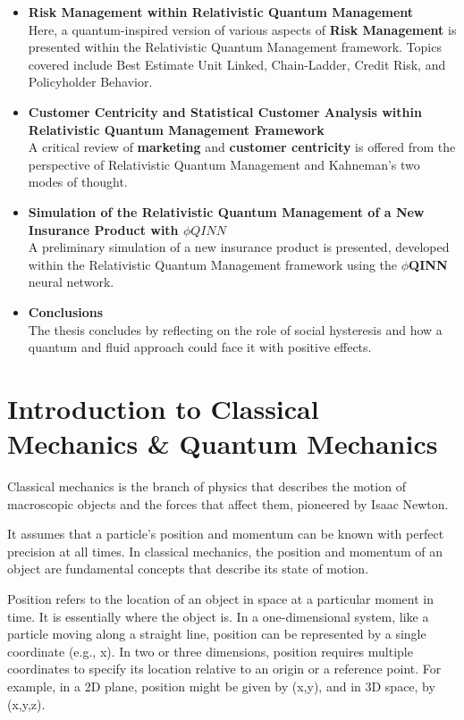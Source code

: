 \documentclass{article}
\begin{document}
\begin{itemize}[leftmargin=*,label=\textbf{\textbullet}]
    \item \textbf{Risk Management within Relativistic Quantum Management}\\
    Here, a quantum-inspired version of various aspects of \textbf{Risk Management} is presented within the Relativistic Quantum Management framework. Topics covered include Best Estimate Unit Linked, Chain-Ladder, Credit Risk, and Policyholder Behavior.

    \item \textbf{Customer Centricity and Statistical Customer Analysis within Relativistic Quantum Management Framework}\\
    A critical review of \textbf{marketing} and \textbf{customer centricity} is offered from the perspective of Relativistic Quantum Management and Kahneman's two modes of thought.

    \item \textbf{Simulation of the Relativistic Quantum Management of a New Insurance Product with $\phi QINN$}\\
    A preliminary simulation of a new insurance product is presented, developed within the Relativistic Quantum Management framework using the \textbf{$\phi$QINN} neural network.

    \item \textbf{Conclusions}\\
    The thesis concludes by reflecting on the role of social hysteresis and how a quantum and fluid approach could face it with positive effects.
\end{itemize}


\newpage
\section{Introduction to Classical Mechanics \& Quantum Mechanics}
\label{sec1}
Classical mechanics is the branch of physics that describes the motion of macroscopic objects and the forces that affect them, pioneered by Isaac Newton.

It assumes that a particle's position and momentum can be known with perfect precision at all times. In classical mechanics, the position and momentum of an object are fundamental concepts that describe its state of motion. 

Position refers to the location of an object in space at a particular moment in time. It is essentially where the object is. In a one-dimensional system, like a particle moving along a straight line, position can be represented by a single coordinate (e.g., x). In two or three dimensions, position requires multiple coordinates to specify its location relative to an origin or a reference point. For example, in a 2D plane, position might be given by (x,y), and in 3D space, by (x,y,z). 
\end{document}
